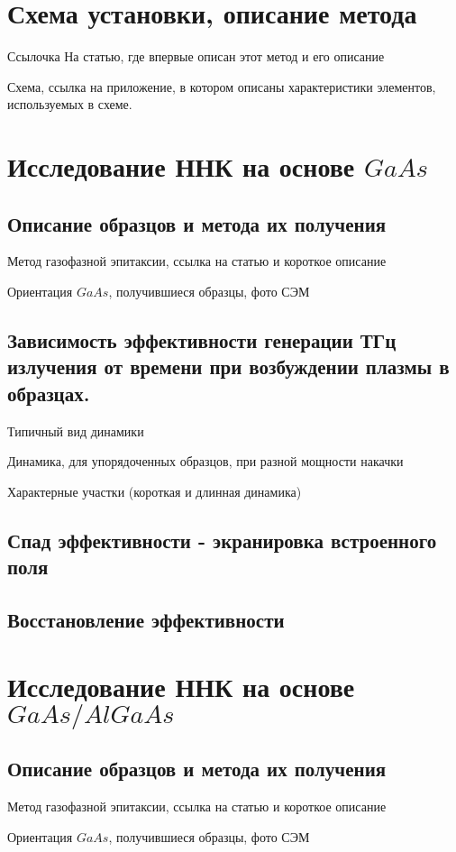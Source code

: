 \documentclass[a4paper,14pt,russian]{extreport}
\begin{document}
		\section{Схема установки, описание метода}
			Ссылочка На статью, где впервые описан этот метод и его описание\par	
			Схема, ссылка на приложение, в котором описаны характеристики элементов, используемых в схеме.\par
			\newpage
		\section{Исследование ННК на основе $GaAs$}
			\subsection{Описание образцов и метода их получения}
				Метод газофазной эпитаксии, ссылка на
				статью и короткое описание\par
				Ориентация $GaAs$, получившиеся образцы,
				фото СЭМ
			\newpage
			\subsection{Зависимость эффективности генерации ТГц излучения от времени при возбуждении плазмы в образцах.}
				Типичный вид динамики\par
				Динамика, для упорядоченных образцов,
				при разной мощности накачки\par
				Характерные участки (короткая и длинная
				динамика)\par
			\subsection{Спад эффективности - экранировка встроенного поля}
			\subsection{Восстановление эффективности}
		\section{Исследование ННК на основе $GaAs/AlGaAs$}
			\subsection{Описание образцов и метода их получения}
				Метод газофазной эпитаксии, ссылка на
				статью и короткое описание\par
				Ориентация $GaAs$, получившиеся образцы,
				фото СЭМ
			\newpage
\end{document}
